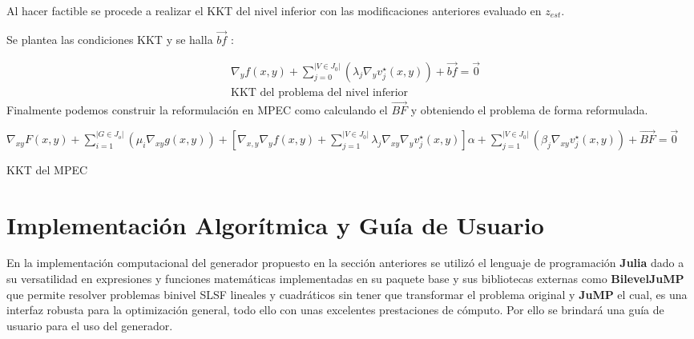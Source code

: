 Al hacer factible se procede a realizar el KKT del nivel inferior con las modificaciones anteriores evaluado en $z_{est}$.

Se plantea las condiciones KKT y se halla $\vec{bf}$ :

\begin{equation}
    \begin{aligned}
        &\nabla_{y}f(x,y)+\sum_{j=0}^{|V \in J_0|}(\lambda_j\nabla_{y}v_{j}^{\star}(x,y))+\vec{bf}=\vec{0}\\
        &\text{KKT del problema del nivel inferior}
    \end{aligned}
    \label{KKT_nivel_inferior}
\end{equation}
\linebreak
Finalmente podemos construir la reformulación en MPEC como  calculando el $\vec{BF}$ y 
obteniendo el problema de forma reformulada.
\begin{table}[H]
    \begin{equation}
        \label{KKT_del_MPEC}
    \end{equation}
	$\nabla_{xy}F(x,y)+\sum_{i=1}^{|G \in J_o|}(\mu_i\nabla_{xy}g(x,y))+[\nabla_{x,y}\nabla_{y}f(x,y)+\sum_{j=1}^{|V \in J_0|}\lambda_j\nabla_{xy}\nabla_{y}v_{j}^{\star}(x,y)]\alpha+\sum_{j=1}^{|V \in J_0|}(\beta_j\nabla_{xy}v_{j}^{\star}(x,y))+\vec{BF}=\vec{0}$  \label{KKT_del_MPEC}
\caption*{KKT del MPEC}
\end{table}


\section{Implementación Algorítmica y Guía de Usuario}
En la implementación computacional del generador propuesto en la sección anteriores
se utilizó el lenguaje de programación \textbf{Julia} \cite{Juliadocs} dado a su versatilidad
en expresiones y funciones matemáticas implementadas en su paquete base y sus bibliotecas externas como 
\textbf{BilevelJuMP} \cite{BilevelJump} que permite resolver problemas binivel SLSF lineales y cuadráticos
sin tener que transformar el problema original y \textbf{JuMP} \cite{JuMPPaper} el cual, es una interfaz robusta para la optimización general,
todo ello con unas excelentes prestaciones de cómputo. Por ello se brindará una guía de usuario para el uso del generador.

